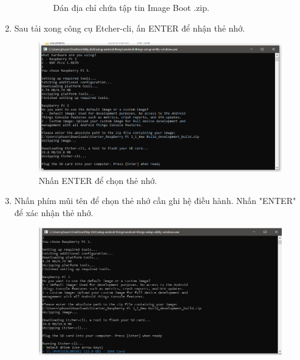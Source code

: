 \begin{enumerate}
\begin{itemize}
\begin{center}
\begin{figure}[htp]
\begin{center}
\end{center}
\caption{Dán địa chỉ chứa tập tin Image Boot .zip.}
\label{refhinh1}
\end{figure}
\end{center}
\end{itemize}
\newpage
\item Sau tải xong công cụ Etcher-cli, ấn ENTER để nhận thẻ nhớ.
\begin{center}
\begin{figure}[htp]
\begin{center}
\includegraphics[scale=0.5]{image3/buoc2cach2s9.png}
\end{center}
\caption{Nhấn ENTER để chọn thẻ nhớ.}
\label{refhinh1}
\end{figure}
\end{center}
\item Nhấn phím mũi tên để chọn thẻ nhớ cần ghi hệ điều hành. Nhấn "ENTER" để xác nhận thẻ nhớ.
\begin{center}
\begin{figure}[htp]
\begin{center}
\includegraphics[scale=0.53]{image3/buoc2cach2s10.png}
\end{center}

\end{figure}
\end{center}
\end{enumerate}
